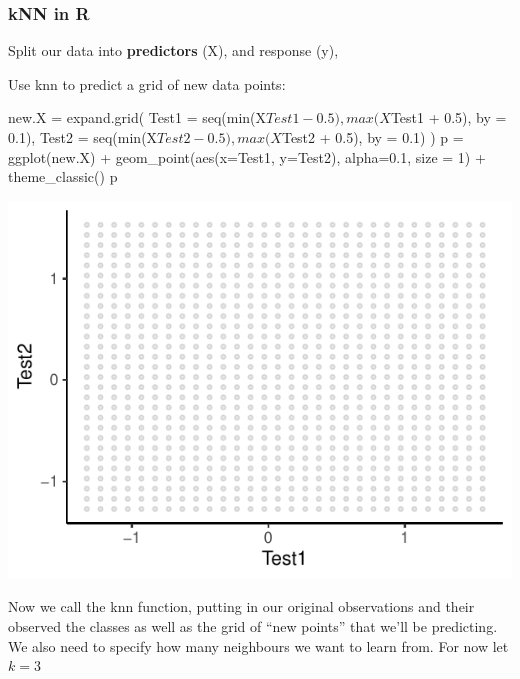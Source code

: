 \documentclass[a4paper]{article}\usepackage[]{graphicx}\usepackage[]{xcolor}
\makeatletter
\def\maxwidth{ %
  \ifdim\Gin@nat@width>\linewidth
    \linewidth
  \else
    \Gin@nat@width
  \fi
}
\makeatother
\begin{document}
\subsubsection{kNN in R}
Split our data into \textbf{predictors} (X), and response (y),
\begin{Schunk}
\end{Schunk}
Use knn to predict a grid of new data points:
\begin{Schunk}
\begin{Sinput}
new.X = expand.grid(
  Test1 = seq(min(X$Test1 - 0.5),
              max(X$Test1 + 0.5), 
              by = 0.1),
  Test2 = seq(min(X$Test2 - 0.5), 
              max(X$Test2 + 0.5),
              by = 0.1)
  )
p = ggplot(new.X) +
  geom_point(aes(x=Test1, y=Test2), 
             alpha=0.1, size = 1) +
  theme_classic()
p
\end{Sinput}


{\centering \includegraphics[width=\maxwidth]{figure/listings-unnamed-chunk-453-1} 

}

\end{Schunk}
Now we call the knn function, putting in our original observations and their observed the classes as well as the grid of ``new points'' that we'll be predicting.
We also need to specify how many neighbours we want to learn from. For now let \( k = 3 \) 
\end{document}

